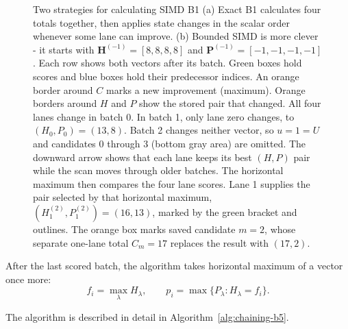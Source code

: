 \begin{figure}[H]
\caption{Two strategies for calculating SIMD B1 (a) Exact B1 calculates
four totals together, then applies state changes in the scalar order whenever
some lane can improve.  (b) Bounded SIMD is more clever - it starts with
\(\mathbf H^{(-1)}=[8,8,8,8]\) and
\(\mathbf P^{(-1)}=[-1,-1,-1,-1]\).  Each row shows both vectors after its
batch.  Green boxes hold scores and blue boxes hold their predecessor indices.
An orange border around \(C\) marks a new improvement (maximum). Orange
borders around \(H\) and \(P\) show the stored pair that changed.  All four
lanes change in batch 0.  In batch 1, only lane zero changes, to
\((H_0,P_0)=(13,8)\).
Batch 2 changes neither vector, so \(u=1=U\) and candidates 0 through 3 (bottom gray area) are
omitted.  The downward arrow shows that each lane keeps its best
\((H,P)\) pair while the scan moves through older batches.  The horizontal
maximum then compares the four lane scores.  Lane 1 supplies the pair selected
by that horizontal maximum,
\((H^{(2)}_1,P^{(2)}_1)=(16,13)\), marked by the green bracket and outlines.
The orange box marks saved candidate \(m=2\), whose separate one-lane total
\(C_m=17\) replaces the result with \((17,2)\).}
\label{fig:chaining-b5-batches}
\end{figure}

After the last scored batch, the algorithm takes horizontal maximum of a vector once more:
\begin{equation}
 f_i=\max_\lambda H_\lambda,
 \qquad
 p_i=\max\{P_\lambda:H_\lambda=f_i\}.
 \label{eq:chaining-b5-horizontal-reduction}
\end{equation}

The algorithm is described in detail in Algorithm~\ref{alg:chaining-b5}.

